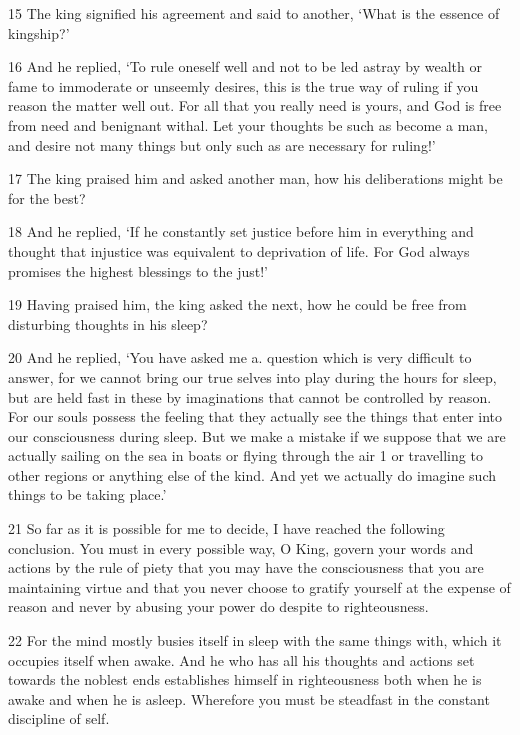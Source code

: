 \par 15 The king signified his agreement and said to another, ‘What is the essence of kingship?’

\par 16 And he replied, ‘To rule oneself well and not to be led astray by wealth or fame to immoderate or unseemly desires, this is the true way of ruling if you reason the matter well out. For all that you really need is yours, and God is free from need and benignant withal. Let your thoughts be such as become a man, and desire not many things but only such as are necessary for ruling!’

\par 17 The king praised him and asked another man, how his deliberations might be for the best?

\par 18 And he replied, ‘If he constantly set justice before him in everything and thought that injustice was equivalent to deprivation of life. For God always promises the highest blessings to the just!’

\par 19 Having praised him, the king asked the next, how he could be free from disturbing thoughts in his sleep?

\par 20 And he replied, ‘You have asked me a. question which is very difficult to answer, for we cannot bring our true selves into play during the hours for sleep, but are held fast in these by imaginations that cannot be controlled by reason. For our souls possess the feeling that they actually see the things that enter into our consciousness during sleep. But we make a mistake if we suppose that we are actually sailing on the sea in boats or flying through the air 1 or travelling to other regions or anything else of the kind. And yet we actually do imagine such things to be taking place.’

\par 21 So far as it is possible for me to decide, I have reached the following conclusion. You must in every possible way, O King, govern your words and actions by the rule of piety that you may have the consciousness that you are maintaining virtue and that you never choose to gratify yourself at the expense of reason and never by abusing your power do despite to righteousness.

\par 22 For the mind mostly busies itself in sleep with the same things with, which it occupies itself when awake. And he who has all his thoughts and actions set towards the noblest ends establishes himself in righteousness both when he is awake and when he is asleep. Wherefore you must be steadfast in the constant discipline of self.

